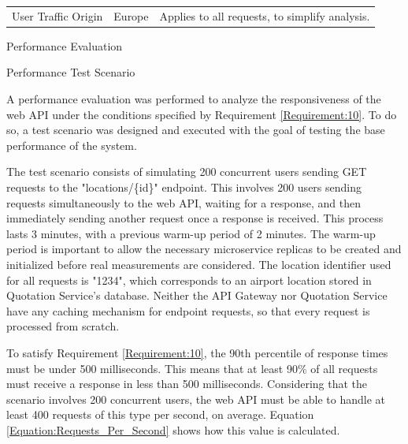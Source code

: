 \documentclass[12pt, reqno]{amsbook}
\makeatletter
\def\section{\@startsection{section}{1}%
      \z@{.5\linespacing\@plus.7\linespacing}{.25\linespacing}%
      {\normalfont\bfseries\flushleft}}
\def\subsection{\@startsection{subsection}{2}%
      \z@{.5\linespacing\@plus.7\linespacing}{.25\linespacing}%
      {\normalfont\bfseries\flushleft}}
\theoremstyle{definition}
\theoremstyle{definition}
\numberwithin{section}{chapter}
\numberwithin{table}{chapter}
\numberwithin{figure}{chapter}
\makeatother
\begin{document}
\begin{longtable}{|M{70pt}|M{55pt}|m{300pt}|}
  \hline
  User Traffic Origin
   & Europe
   & Applies to all requests, to simplify analysis.                                                                                                                                                                                                                                                                                                                                                                                                                                      \\
\end{longtable}

\section{Performance Evaluation}
\label{Section:Performance_Evaluation}

\subsection{Performance Test Scenario}
\label{Subsection:Performance_Test_Scenario}

A performance evaluation was performed to analyze the responsiveness of the web \ac{API} under the conditions specified by Requirement \ref{Requirement:10}. To do so, a test scenario was designed and executed with the goal of testing the base performance of the system.

The test scenario consists of simulating 200 concurrent users sending GET requests to the "locations/\{id\}" endpoint. This involves 200 users sending requests simultaneously to the web \ac{API}, waiting for a response, and then immediately sending another request once a response is received. This process lasts 3 minutes, with a previous warm-up period of 2 minutes. The warm-up period is important to allow the necessary microservice replicas to be created and initialized before real measurements are considered. The location identifier used for all requests is "1234", which corresponds to an airport location stored in Quotation Service's database. Neither the \ac{API} Gateway nor Quotation Service have any caching mechanism for endpoint requests, so that every request is processed from scratch.

To satisfy Requirement \ref{Requirement:10}, the 90th percentile of response times must be under 500 milliseconds. This means that at least 90\% of all requests must receive a response in less than 500 milliseconds. Considering that the scenario involves 200 concurrent users, the web \ac{API} must be able to handle at least 400 requests of this type per second, on average. Equation \ref{Equation:Requests_Per_Second} shows how this value is calculated.
\end{document}
